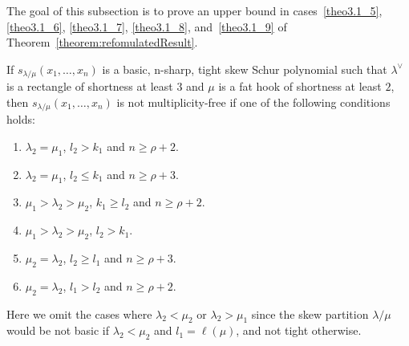 \documentclass[ALCO,ThmDefs,Unicode,epreuves]{cedram}
\begin{document}
The goal of this subsection is to prove an upper bound in cases~\ref{theo3.1_5}, \ref{theo3.1_6}, \ref{theo3.1_7}, \ref{theo3.1_8}, and~\ref{theo3.1_9} of Theorem~\ref{theorem:refomulatedResult}.


\begin{theorem}
\label{thm:suffshort3}
If $s_{\lambda/\mu}(x_1,\ldots,x_n)$ is a basic, n-sharp, tight skew Schur polynomial such that $\lambda^\vee$ is a rectangle of shortness at least $3$ and $\mu$ is a fat hook of shortness at least $2$, then $s_{\lambda/\mu}(x_1,\ldots,x_n)$ is not multiplicity-free if one of the following conditions holds:
\begin{enumerate}[label=(\Roman{*})]
 \item\label{theo3.13_1} $\lambda_2 = \mu_1$, $l_2 > k_1$ and $n\geq \rho+2$.
 \item\label{theo3.13_2} $\lambda_2 = \mu_1$, $l_2 \leq k_1$ and $n\geq \rho+3$.
 \item\label{theo3.13_3} $\mu_1 > \lambda_2 > \mu_2$, $k_1 \geq l_2$ and $n \geq \rho+2$.
 \item\label{theo3.13_4} $\mu_1 > \lambda_2 > \mu_2$, $l_2 > k_1$.
 \item\label{theo3.13_5} $\mu_2 = \lambda_2$, $l_2 \geq l_1$ and $n\geq \rho+3$.
 \item\label{theo3.13_6} $\mu_2 = \lambda_2$, $l_1 > l_2$ and $n\geq \rho+2$.
\end{enumerate}
\end{theorem}

Here we omit the cases where $\lambda_2<\mu_2$ or $\lambda_2>\mu_1$ since the skew partition $\lambda/\mu$ would be not basic if $\lambda_2<\mu_2$ and $l_1 = \ell(\mu)$, and not tight otherwise. 
\end{document}
